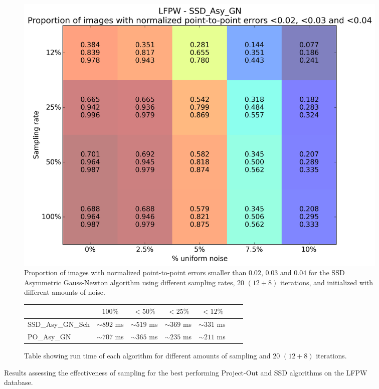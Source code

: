 \begin{figure}[p]
\begin{subfigure}{0.48\textwidth}
	    \label{fig:sampling_vs_noise_ssd_asy_gn_20}
	\end{subfigure}
	\hfill
	\begin{subfigure}{0.48\textwidth}
	    \includegraphics[width=\textwidth]{experiments/sampling/sampling_vs_noise_ssd_asy_gn_20.png}
	    \caption{Proportion of images with normalized point-to-point errors smaller than $0.02$, $0.03$ and $0.04$ for the SSD Asymmetric Gauss-Newton algorithm using different sampling rates, $20$ $(12 + 8)$ iterations, and initialized with different amounts of noise.}
	    \label{fig:sampling_vs_noise_po_asy_gn_20}
	\end{subfigure}
	\par\bigskip\bigskip
	\begin{subfigure}{\textwidth}
		\center
		\begin{tabular}{lcccccc}
		    \toprule
		    & $100\%$ & $<50\%$ & $<25\%$ & $<12\%$ 
		    \\
		    \midrule
		    SSD\_Asy\_GN\_Sch & $\sim892$ ms & $\sim519$ ms & $\sim369$ ms & $\sim331$ ms
		    \\
		    PO\_Asy\_GN & $\sim707$ ms & $\sim365$ ms & $\sim235$ ms & $\sim211$ ms
		    \\ 
		    \bottomrule
	  	\end{tabular}
	  	\caption{Table showing run time of each algorithm for different amounts of sampling and $20$ $(12 + 8)$ iterations.}
	    \label{tab:runtime_20}
	\end{subfigure}
	\caption{Results assessing the effectiveness of sampling for the best performing Project-Out and SSD algorithms on the LFPW database.}
	\label{fig:sampling}
\end{figure}


